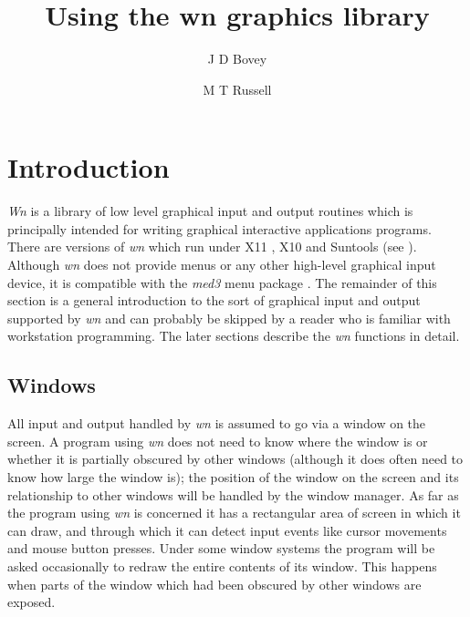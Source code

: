 %
\oddsidemargin 0in
\evensidemargin 0in
\topmargin 0in
\textwidth 6.25in
\textheight 8.75in
\parindent 0in
\parskip 0.1in
\title{Using the wn graphics library}
\author{J D Bovey \and M T Russell}
\pagestyle{headings}
\newcommand{\funclabel}[1]{\label{#1}}

\maketitle
\tableofcontents
\newpage
\section{Introduction}
{\em Wn} is a library of low level graphical input and output routines
which is principally intended for writing graphical interactive applications
programs. There are versions of {\em wn} which run under X11 \cite{xlib}, X10
and Suntools (see \cite{sunviewprog,sunviewsysprog,pixrect}).
Although {\em wn} does not provide menus or any other high-level
graphical input device, it is compatible with the {\em med3} menu package \cite{med3doc}.
The remainder of this section is a general introduction
to the sort of graphical input and output supported by {\em wn}
and can probably be skipped by a reader who is familiar with workstation
programming.
The later sections describe the {\em wn} functions in detail.
%
\subsection{Windows}
All input and output handled by {\em wn} is assumed to go via a window
on the screen. A program using {\em wn} does not need to know where the
window is or whether it is partially obscured by other windows
(although it does often need to know how large the window is); the position
of the window on the screen and its relationship to other windows 
will be handled by the window manager.
As far as the program using {\em wn} is concerned it has a rectangular
area of screen in which it can draw, and through which it can detect input
events like cursor movements and mouse button presses.
Under some window systems the program will be asked occasionally to
redraw the entire contents of its window.
This happens when parts of the window which had been obscured by
other windows are exposed.
%
